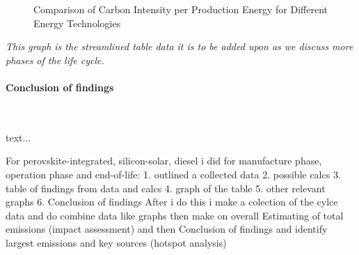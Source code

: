\documentclass{article}
\begin{document}
\begin{figure}[H]
	\centering
	\caption{Comparison of Carbon Intensity per Production Energy for Different Energy Technologies}
	\label{fig:carbon_intensity}
\end{figure}
\vspace{-1em}
\textit{This graph is the streamlined table data it is to be added upon as we discuss more phases of the life cycle.}

\paragraph{Conclusion of findings}\mbox{}\\[-6pt]\noindent

text...

\newpage

\begin{tcolorbox}[title={\subsubsection{Operational Phase}\vspace{-1em}}, colback=white, colframe=green!50!black, boxrule=0.4mm, width=1\textwidth]

\end{tcolorbox}


For perovskite-integrated, silicon-solar, diesel
i did for manufacture phase, operation phase and end-of-life:
1. outlined a collected data
2. possible calcs
3. table of findings from data and calcs
4. graph of the table
5. other relevant graphs
6. Conclusion of findings
After i do this i make a colection of the cylce data and do combine data like graphs then make on overall  Estimating of total emissions (impact assessment) and then Conclusion of findings and identify largest emissions and key sources (hotspot analysis)	
\end{document}
